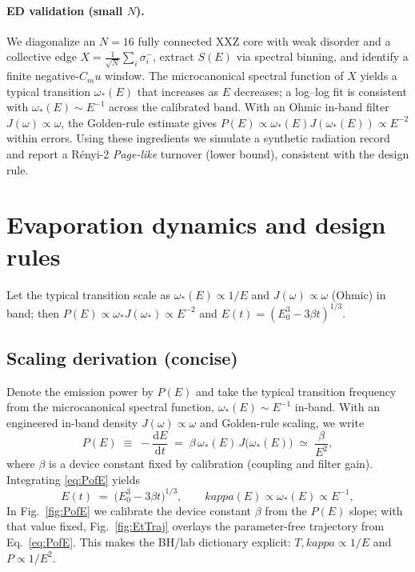 \documentclass[aps,prx,onecolumn,showpacs,superscriptaddress,longbibliography,nofootinbib]{revtex4-2}
\def\kappa{kappa}%
\def\mu{mu}%
\begin{document}
\paragraph*{ED validation (small $N$).}
We diagonalize an $N{=}16$ fully connected XXZ core with weak disorder and a collective edge $X=\frac{1}{\sqrt{N}}\sum_i \sigma_i^-$, extract $S(E)$ via spectral binning, and identify a finite negative-$C_\mu$ window. The microcanonical spectral function of $X$ yields a typical transition $\omega_\ast(E)$ that increases as $E$ decreases; a log--log fit is consistent with $\omega_\ast(E)\sim E^{-1}$ across the calibrated band. With an Ohmic in-band filter $J(\omega)\propto \omega$, the Golden-rule estimate gives $P(E)\propto \omega_\ast(E)J(\omega_\ast(E))\propto E^{-2}$ within errors. Using these ingredients we simulate a synthetic radiation record and report a R\'enyi-2 \emph{Page-like} turnover (lower bound), consistent with the design rule.

\section{Evaporation dynamics and design rules}
Let the typical transition scale as $\omega_\ast(E)\propto 1/E$ and $J(\omega)\propto \omega$ (Ohmic) in band; then $P(E)\propto \omega_\ast J(\omega_\ast)\propto E^{-2}$ and $E(t)=(E_0^3-3\beta t)^{1/3}$.

\subsection{Scaling derivation (concise)}
Denote the emission power by $P(E)$ and take the typical transition frequency from the microcanonical spectral function, $\omega_\ast(E)\sim E^{-1}$ in-band. With an engineered in-band density $J(\omega)\propto\omega$ and Golden-rule scaling, we write
\begin{equation}
P(E)\;\equiv\; -\frac{\mathrm{d}E}{\mathrm{d}t}\;=\; \beta\,\omega_\ast(E)\,J\big(\omega_\ast(E)\big)\;\simeq\; \frac{\beta}{E^2},\label{eq:PofE}
\end{equation}
where $\beta$ is a device constant fixed by calibration (coupling and filter gain). Integrating \eqref{eq:PofE} yields
\begin{equation}
E(t)\;=\;\big(E_0^3-3\beta t\big)^{1/3},\qquad \kappa(E)\propto \omega_\ast(E)\propto E^{-1},
\end{equation}
  In Fig.~\ref{fig:PofE} we calibrate the device constant $\beta$ from the $P(E)$ slope; with that value fixed, Fig.~\ref{fig:EtTraj} overlays the parameter-free trajectory from Eq.~\eqref{eq:PofE}. This makes the BH/lab dictionary explicit: $T,\kappa\propto 1/E$ and $P\propto 1/E^2$.
\end{document}

